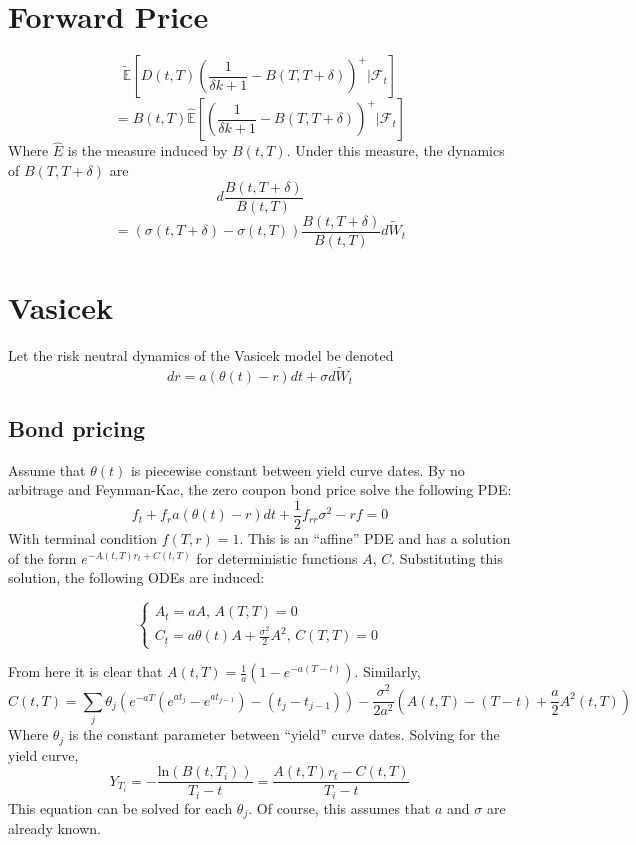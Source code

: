 \documentclass{article}
\theoremstyle{definition}
\begin{document}
\section{Forward Price}

\[\mathbb{\tilde{E}}\left[D(t, T)\left(\frac{1}{\delta k+1}-B(T, T+\delta)\right)^+ |\mathcal{F}_t\right]\]
\[=B(t, T)\mathbb{\hat{E}}\left[\left(\frac{1}{\delta k+1}-B(T, T+\delta)\right)^+ |\mathcal{F}_t\right]\]
Where \(\hat{E}\) is the measure induced by \(B(t, T)\).  Under this measure, the dynamics of \(B(T, T+\delta)\) are 
\[d\frac{B(t, T+\delta)}{B(t, T)}\]
\[=\left(\sigma(t, T+\delta)-\sigma(t, T)\right) \frac{B(t, T+\delta)}{B(t, T)}d\tilde{W}_t\]

\section{Vasicek}
Let the risk neutral dynamics of the Vasicek model be denoted 
\[dr=a(\theta(t)-r)dt+\sigma d\tilde{W}_t\]

\subsection{Bond pricing}

Assume that \(\theta(t)\) is piecewise constant between yield curve dates.  By no arbitrage and Feynman-Kac, the zero coupon bond price solve the following PDE:
\[f_t+f_r a(\theta(t)-r)dt+\frac{1}{2}f_{rr} \sigma^2 -rf=0\]
With terminal condition \(f(T, r)=1\).  This is an ``affine'' PDE and has a solution of the form \(e^{-A(t, T)r_t+C(t, T)}\) for deterministic functions \(A\), \(C\).  Substituting this solution, the following ODEs are induced:

\[\begin{cases}
A_t=aA,\,A(T, T)=0\\
C_t=a\theta(t)A+\frac{\sigma^2}{2} A^2,\,C(T, T)=0
\end{cases} 
\]

From here it is clear that \(A(t, T)=\frac{1}{a}\left(1-e^{-a(T-t)}\right)\).  Similarly, 
\[C(t, T)= \sum_j \theta_j \left(e^{-aT}\left(e^{at_j}-e^{at_{j-1}}\right)-(t_j-t_{j-1})\right)-\frac{\sigma^2}{2a^2}\left(A(t, T)-(T-t)+\frac{a}{2}A^2(t, T) \right)\]
Where \(\theta_j\) is the constant parameter between ``yield'' curve dates.  Solving for the yield curve, 
\[Y_{T_i}=-\frac{\mathrm{ln}(B(t, T_i))}{T_i-t}=\frac{A(t, T)r_t-C(t, T)}{T_i-t}\]
This equation can be solved for each \(\theta_j\).  Of course, this assumes that \(a\) and \(\sigma\) are already known.
\end{document}
